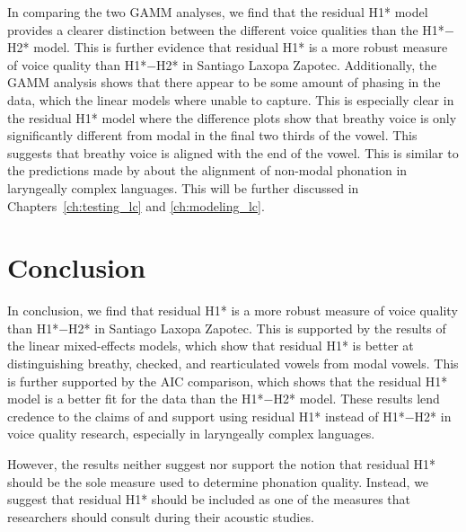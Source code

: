 In comparing the two GAMM analyses, we find that the residual H1* model provides a clearer distinction between the different voice qualities than the H1*$-$H2* model. This is further evidence that residual H1* is a more robust measure of voice quality than H1*$-$H2* in Santiago Laxopa Zapotec. Additionally, the GAMM analysis shows that there appear to be some amount of phasing in the data, which the linear models where unable to capture. This is especially clear in the residual H1* model where the difference plots show that breathy voice is only significantly different from modal in the final two thirds of the vowel. This suggests that breathy voice is aligned with the end of the vowel. This is similar to the predictions made by \citet{silvermanLaryngealComplexityOtomanguean1997,silvermanPhasingRecoverability1997} about the alignment of non-modal phonation in laryngeally complex languages. This will be further discussed in Chapters~\ref{ch:testing_lc} and \ref{ch:modeling_lc}.

\section{Conclusion} \label{sec:Conclusion}

In conclusion, we find that residual H1* is a more robust measure of voice quality than H1*$-$H2* in Santiago Laxopa Zapotec. This is supported by the results of the linear mixed-effects models, which show that residual H1* is better at distinguishing breathy, checked, and rearticulated vowels from modal vowels. This is further supported by the AIC comparison, which shows that the residual H1* model is a better fit for the data than the H1*$-$H2* model. These results lend credence to the claims of \citet{chaiH1H2AcousticMeasure2022} and support using residual H1* instead of H1*$-$H2* in voice quality research, especially in laryngeally complex languages.

However, the results neither suggest nor support the notion that residual H1* should be the sole measure used to determine phonation quality. Instead, we suggest that residual H1* should be included as one of the measures that researchers should consult during their acoustic studies. 